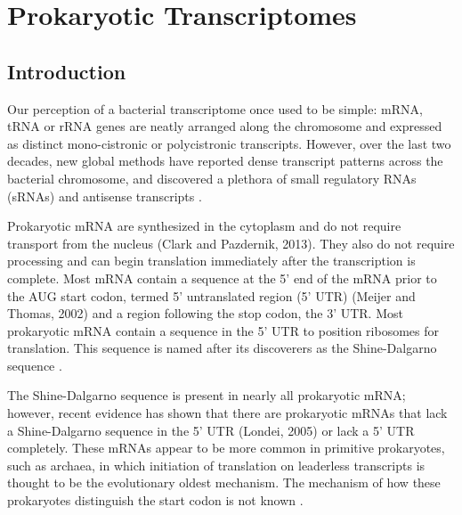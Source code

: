 \chapter{Prokaryotic Transcriptomes}\label{chp:prokaryotic_transcriptomes}

\minitoc

\section{Introduction}

Our perception of a bacterial transcriptome once used to be simple: mRNA, tRNA or rRNA genes are neatly arranged along the 
chromosome and expressed as distinct mono-cistronic or polycistronic transcripts. However, over the last two decades, 
new global methods have reported dense transcript patterns across the bacterial chromosome, and discovered a plethora of 
small regulatory RNAs (sRNAs) and antisense transcripts \cite{Sharma2014}. 

Prokaryotic mRNA are synthesized in the cytoplasm and do not require transport from the nucleus (Clark and Pazdernik, 2013). 
They also do not require processing and can begin translation immediately after the transcription is complete. Most mRNA 
contain a sequence at the 5' end of the mRNA prior to the AUG start codon, termed 5' untranslated region (5' UTR) 
(Meijer and Thomas, 2002) and a region following the stop codon, the 3' UTR. Most prokaryotic mRNA contain a sequence in 
the 5' UTR to position ribosomes for translation. This sequence is named after its discoverers as the Shine-Dalgarno sequence \cite{Goss2016}. 

The Shine-Dalgarno sequence is present in nearly all prokaryotic mRNA; however, recent evidence has shown that there are 
prokaryotic mRNAs that lack a Shine-Dalgarno sequence in the 5' UTR (Londei, 2005) or lack a 5' UTR completely. These mRNAs 
appear to be more common in primitive prokaryotes, such as archaea, in which initiation of translation on leaderless transcripts 
is thought to be the evolutionary oldest mechanism. The mechanism of how these prokaryotes distinguish the start codon is not known \cite{Goss2016}. 

